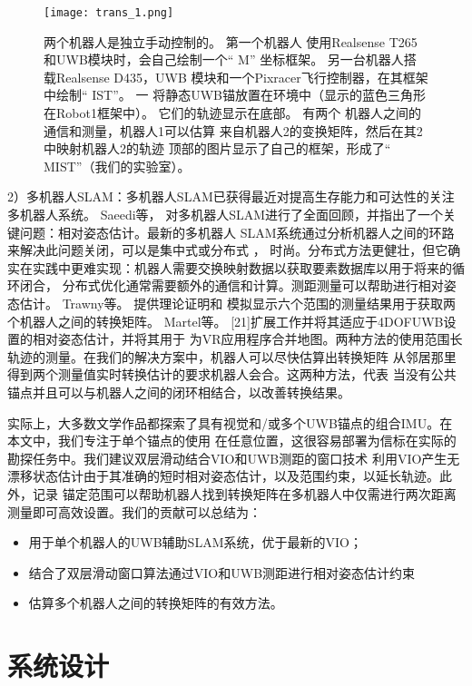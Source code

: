 \begin{translation}
\begin{figure}
  \centering
  \texttt{[image: trans\_1.png]}
  \caption{两个机器人是独立手动控制的。 第一个机器人
使用Realsense T265和UWB模块时，会自己绘制一个“ M”
坐标框架。 另一台机器人搭载Realsense D435，UWB
模块和一个Pixracer飞行控制器，在其框架中绘制“ IST”。 一
将静态UWB锚放置在环境中（显示的蓝色三角形
在Robot1框架中）。 它们的轨迹显示在底部。 有两个
机器人之间的通信和测量，机器人1可以估算
来自机器人2的变换矩阵，然后在其2中映射机器人2的轨迹
顶部的图片显示了自己的框架，形成了“ MIST”（我们的实验室）。}
  \label{fig:gmapping}
\end{figure}


2）多机器人SLAM：多机器人SLAM已获得最近对提高生存能力和可达性的关注多机器人系统。 Saeedi等，\cite{saeedi2016multiple}
对多机器人SLAM进行了全面回顾，并指出了一个关键问题：相对姿态估计。最新的多机器人
SLAM系统通过分析机器人之间的环路来解决此问题关闭，可以是集中式\cite{schmuck2019ccm}或分布式
\cite{choudhary2017distributed}，\cite{mangelson2018pairwise}
时尚。分布式方法更健壮，但它确实在实践中更难实现：机器人需要交换映射数据以获取要素数据库以用于将来的循环闭合，
分布式优化通常需要额外的通信和计算。测距测量可以帮助进行相对姿态估计。 Trawny等。 \cite{trawny20093d}提供理论证明和
模拟显示六个范围的测量结果用于获取两个机器人之间的转换矩阵。
Martel等。 [21]扩展工作并将其适应于4DOFUWB设置的相对姿态估计，并将其用于
为VR应用程序合并地图。两种方法的使用范围长轨迹的测量。在我们的解决方案中，机器人可以尽快估算出转换矩阵
从邻居那里得到两个测量值实时转换估计的要求机器人会合。这两种方法\cite{trawny20093d}，\cite{molina2019unique}代表
当没有公共锚点并且可以与机器人之间的闭环相结合，以改善转换结果。

实际上，大多数文学作品都探索了具有视觉和/或多个UWB锚点的组合IMU。在本文中，我们专注于单个锚点的使用
在任意位置，这很容易部署为信标在实际的勘探任务中。我们建议双层滑动结合VIO和UWB测距的窗口技术
利用VIO产生无漂移状态估计由于其准确的短时相对姿态估计，以及范围约束，以延长轨迹。此外，记录
锚定范围可以帮助机器人找到转换矩阵在多机器人中仅需进行两次距离测量即可高效设置。我们的贡献可以总结为：

\begin{itemize}
	\item 用于单个机器人的UWB辅助SLAM系统，优于最新的VIO；
	\item 结合了双层滑动窗口算法通过VIO和UWB测距进行相对姿态估计约束
	\item 估算多个机器人之间的转换矩阵的有效方法。
\end{itemize}


\section{系统设计}


\end{translation}
